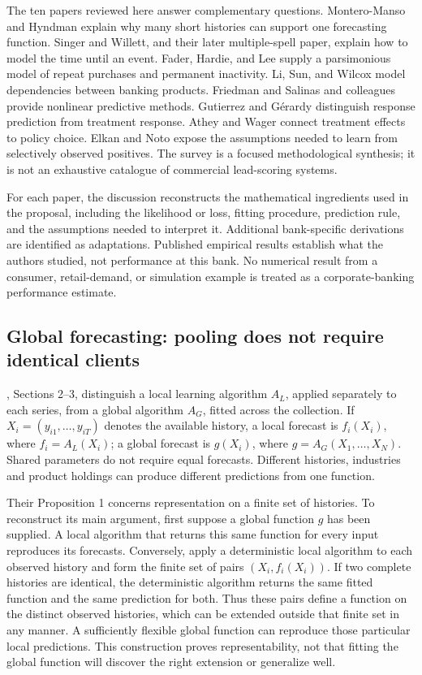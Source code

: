 The ten papers reviewed here answer complementary questions. Montero-Manso and Hyndman explain why many short histories can support one forecasting function. Singer and Willett, and their later multiple-spell paper, explain how to model the time until an event. Fader, Hardie, and Lee supply a parsimonious model of repeat purchases and permanent inactivity. Li, Sun, and Wilcox model dependencies between banking products. Friedman and Salinas and colleagues provide nonlinear predictive methods. Gutierrez and Gérardy distinguish response prediction from treatment response. Athey and Wager connect treatment effects to policy choice. Elkan and Noto expose the assumptions needed to learn from selectively observed positives. The survey is a focused methodological synthesis; it is not an exhaustive catalogue of commercial lead-scoring systems.

For each paper, the discussion reconstructs the mathematical ingredients used in the proposal, including the likelihood or loss, fitting procedure, prediction rule, and the assumptions needed to interpret it. Additional bank-specific derivations are identified as adaptations. Published empirical results establish what the authors studied, not performance at this bank. No numerical result from a consumer, retail-demand, or simulation example is treated as a corporate-banking performance estimate.

\subsection{Global forecasting: pooling does not require identical clients}

\citet{montero2021global}, Sections 2--3, distinguish a local learning algorithm $A_L$, applied separately to each series, from a global algorithm $A_G$, fitted across the collection. If $X_i=(y_{i1},\ldots,y_{iT})$ denotes the available history, a local forecast is $f_i(X_i)$, where $f_i=A_L(X_i)$; a global forecast is $g(X_i)$, where $g=A_G(X_1,\ldots,X_N)$. Shared parameters do not require equal forecasts. Different histories, industries and product holdings can produce different predictions from one function.

Their Proposition 1 concerns representation on a finite set of histories. To reconstruct its main argument, first suppose a global function $g$ has been supplied. A local algorithm that returns this same function for every input reproduces its forecasts. Conversely, apply a deterministic local algorithm to each observed history and form the finite set of pairs $(X_i,f_i(X_i))$. If two complete histories are identical, the deterministic algorithm returns the same fitted function and the same prediction for both. Thus these pairs define a function on the distinct observed histories, which can be extended outside that finite set in any manner. A sufficiently flexible global function can reproduce those particular local predictions. This construction proves representability, not that fitting the global function will discover the right extension or generalize well.


